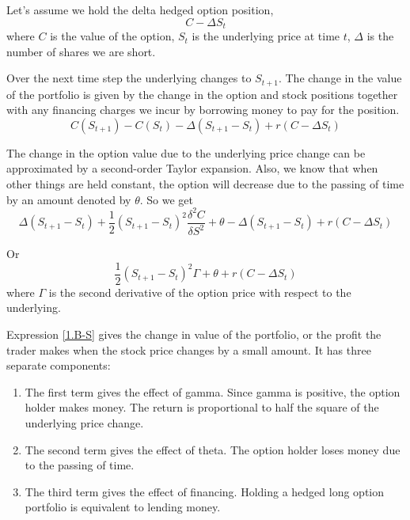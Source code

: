 \documentclass[11pt]{report}
\begin{document}
		Let's assume we hold the delta hedged option position,
		\begin{equation}
			C - \Delta S_t
			\label{1.hedge}
		\end{equation}
		where $C$ is the value of the option, $S_t$ is the underlying price at time $t$, $\Delta$ is the number of shares we are short.

		Over the next time step the underlying changes to $S_{t+1}$. The change in the value of the portfolio is given by the change in the option and stock positions together with any financing charges we incur by borrowing money to pay for the position.
		\begin{equation}
			C(S_{t+1}) - C(S_t) - \Delta(S_{t+1}-S_t) + r(C - \Delta S_t)
			\label{1.hedge2}
		\end{equation}

		The change in the option value due to the underlying price change can be approximated by a second-order Taylor expansion. Also, we know that when other things are held constant, the option will decrease due to the passing of time by an amount denoted by $\theta$. So we get
		\begin{equation}
			\Delta (S_{t+1} - S_t) + \frac{1}{2} (S_{t+1} - S_t)^2 \frac{\delta^2 C}{\delta S^2} + \theta - \Delta (S_{t+1} - S_t) + r (C - \Delta S_t)
			\label{1.hedge3}
		\end{equation}

		Or
		\begin{equation}
			\frac{1}{2} (S_{t+1} - S_t)^2 \Gamma + \theta + r (C - \Delta S_t)
			\label{1.B-S}
		\end{equation}
		where $\Gamma$ is the second derivative of the option price with respect to the underlying.

		Expression \eqref{1.B-S} gives the change in value of the portfolio, or the profit the trader makes when the stock price changes by a small amount. It has three separate components:
		\begin{enumerate}
			\item The first term gives the effect of gamma. Since gamma is positive, the option holder makes money. The return is proportional to half the square of the underlying price change.
			\item The second term gives the effect of theta. The option holder loses money due to the passing of time.
			\item The third term gives the effect of financing. Holding a hedged long option portfolio is equivalent to lending money.
		\end{enumerate}
\end{document}
